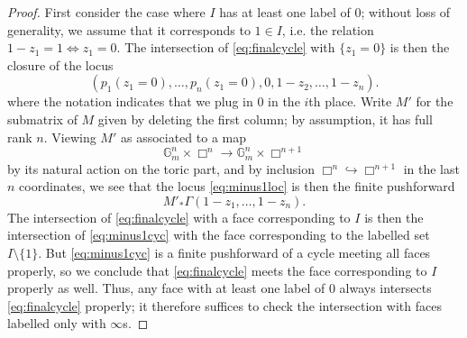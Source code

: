 \documentclass[10pt,a4paper]{amsart}
\begin{document}
\begin{proof}
        First consider the case where $I$ has at least one label of $0$; without loss of generality, we assume that it corresponds to $1\in I$, i.e. the relation $1-z_1=1\Leftrightarrow z_1=0$. The intersection of \eqref{eq:finalcycle} with $\{z_1=0\}$ is then the closure of the locus
        \begin{equation} \label{eq:minus1loc}
        (p_1(z_1=0),\ldots, p_n(z_1=0), 0, 1-z_2,\ldots, 1-z_n).
        \end{equation}
        where the notation indicates that we plug in $0$ in the $i$th place. Write $M'$ for the submatrix of $M$ given by deleting the first column; by assumption, it has full rank $n$. Viewing $M'$ as associated to a map
        \[
        \mathbb{G}_m^n \times \Box^n \to \mathbb{G}_m^n \times \Box^{n+1}
        \]
        by its natural action on the toric part, and by inclusion $\Box^n\hookrightarrow \Box^{n+1}$ in the last $n$ coordinates, we see that the locus \eqref{eq:minus1loc} is then the finite pushforward
        \begin{equation}\label{eq:minus1cyc}
        M'_* \Gamma(1-z_1,\ldots, 1-z_n).
        \end{equation}
        The intersection of \eqref{eq:finalcycle} with a face corresponding to $I$ is then the intersection of \eqref{eq:minus1cyc} with the face corresponding to the labelled set $I\setminus \{1\}$. But \eqref{eq:minus1cyc} is a finite pushforward of a cycle meeting all faces properly, so we conclude that \eqref{eq:finalcycle} meets the face corresponding to $I$ properly as well. Thus, any face with at least one label of $0$ always intersects \eqref{eq:finalcycle} properly; it therefore suffices to check the intersection with faces labelled only with $\infty$s. 


\end{proof}
\end{document}
